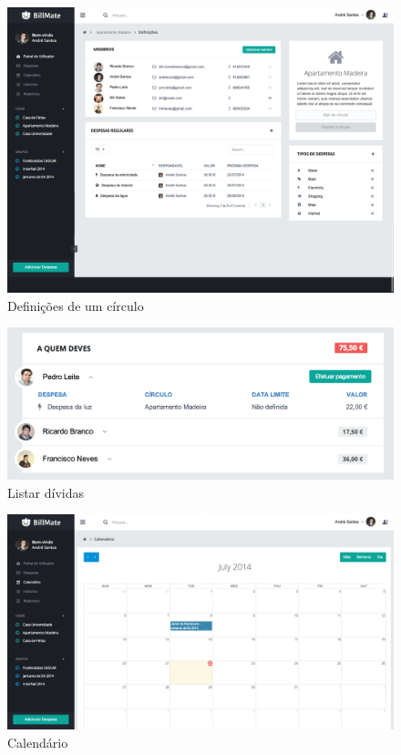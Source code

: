 \begin{referenciaswww}
\begin{figure}[ht]
{
\includegraphics[width=.5\textwidth]{images/andre/settings_circle}
\caption{Definições de um círculo}
}
\end{figure}

\begin{figure}[ht]
{
\includegraphics[width=.5\textwidth]{images/andre/dividas}
\caption{Listar dívidas}
}
\end{figure}

\begin{figure}[ht]
\includegraphics[width=.5\textwidth]{images/andre/calendar}
\caption{Calendário}
\end{figure}


\end{referenciaswww}
